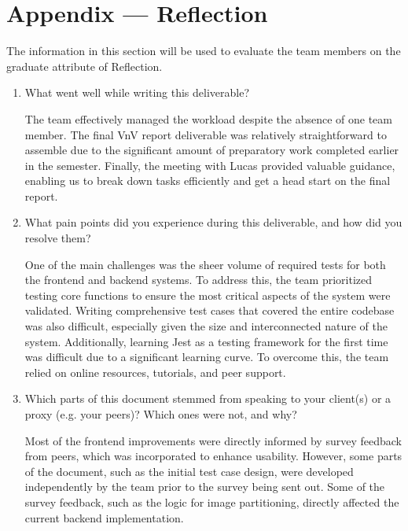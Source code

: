 \documentclass[12pt, titlepage]{article}
\begin{document}



\newpage{}
\section*{Appendix --- Reflection}

The information in this section will be used to evaluate the team members on the
graduate attribute of Reflection.



\begin{enumerate}
  \item What went well while writing this deliverable? 
  
  The team effectively managed the workload despite the absence of one team member. The final VnV report deliverable was relatively straightforward to assemble due to the significant amount of preparatory work completed earlier in the semester. Finally, the meeting with Lucas provided valuable guidance, enabling us to break down tasks efficiently and get a head start on the final report. 

  \item What pain points did you experience during this deliverable, and how
    did you resolve them?

    One of the main challenges was the sheer volume of required tests for both the frontend and backend systems. To address this, the team prioritized testing core functions to ensure the most critical aspects of the system were validated. Writing comprehensive test cases that covered the entire codebase was also difficult, especially given the size and interconnected nature of the system. Additionally, learning Jest as a testing framework for the first time was difficult due to a significant learning curve. To overcome this, the team relied on online resources, tutorials, and peer support.

  \item Which parts of this document stemmed from speaking to your client(s) or
  a proxy (e.g. your peers)? Which ones were not, and why?

   Most of the frontend improvements were directly informed by survey feedback from peers, which was incorporated to enhance usability. However, some parts of the document, such as the initial test case design, were developed independently by the team prior to the survey being sent out. Some of the survey feedback, such as the logic for image partitioning, directly affected the current backend implementation.


\end{enumerate}
\end{document}

